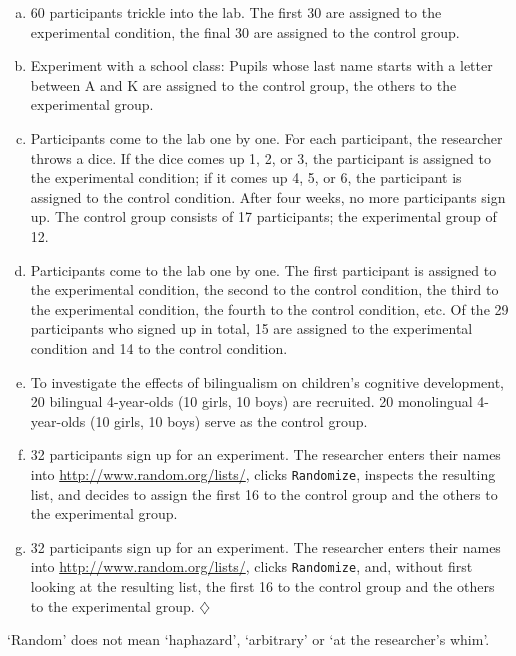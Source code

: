 \documentclass[a4paper]{tufte-book}\usepackage[]{graphicx}\usepackage[]{xcolor}
\newcommand*{\parend}[1][$\diamondsuit$]{%
  \unskip\nobreak\hspace{1em plus 1fill}$\diamondsuit$%
}
\begin{document}
\begin{enumerate}[(a)]
 \item 60 participants trickle into the lab.
 The first 30 are assigned to the experimental condition,
 the final 30 are assigned to the control group.
 
 \item Experiment with a school class:
 Pupils whose last name starts with a letter between
 A and K are assigned to the control group,
 the others to the experimental group.
 
 \item Participants come to the lab one by one.
 For each participant, the researcher throws a dice.
 If the dice comes up 1, 2, or 3, the participant is
 assigned to the experimental condition; if it comes
 up 4, 5, or 6, the participant is assigned to the control
 condition.
 After four weeks, no more participants sign up.
 The control group consists of 17 participants;
 the experimental group of 12.
 
 \item Participants come to the lab one by one.
 The first participant is assigned to the experimental condition,
 the second to the control condition,
 the third to the experimental condition,
 the fourth to the control condition, etc.
 Of the 29 participants who signed up in total, 15 are assigned to the
 experimental condition and 14 to the control condition.
 
 \item To investigate the effects of bilingualism
 on children's cognitive development, 20 bilingual
 4-year-olds (10 girls, 10 boys) are recruited.
 20 monolingual 4-year-olds (10 girls, 10 boys)
 serve as the control group.
 
 \item 32 participants sign up for an experiment.
 The researcher enters their names into \url{http://www.random.org/lists/},
 clicks \texttt{Randomize}, 
 inspects the resulting list,
 and decides to assign
 the first 16 to the control group
 and the others to the experimental group.
 
 \item 32 participants sign up for an experiment.
 The researcher enters their names into \url{http://www.random.org/lists/},
 clicks \texttt{Randomize}, 
 and, without first looking at the resulting list, 
 the first 16 to the control group
 and the others to the experimental group. \parend
\end{enumerate}

\begin{framed}
`Random' does not mean `haphazard', `arbitrary' or `at the researcher's whim'.
\end{framed}
\end{document}
